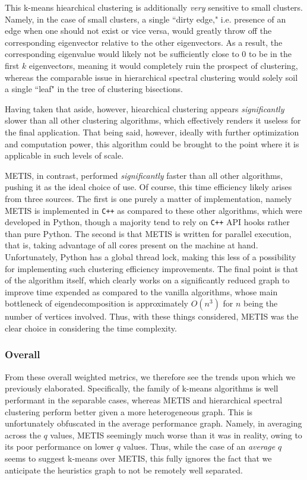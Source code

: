 \documentclass{article}
\begin{document}
This k-means hiearchical clustering is additionally \textit{very} sensitive to small clusters. Namely, in the case of small clusters, a single ``dirty edge," i.e. presence of an edge when one should not exist or vice versa, would greatly throw off the corresponding eigenvector relative to the other eigenvectors. As a result, the corresponding eigenvalue would likely not be sufficiently close to 0 to be in the first $k$ eigenvectors, meaning it would completely ruin the prospect of clustering, whereas the comparable issue in hierarchical spectral clustering would solely soil a single ``leaf" in the tree of clustering bisections.

Having taken that aside, however, hiearchical clustering appears \textit{significantly} slower than all other clustering algorithms, which effectively renders it useless for the final application. That being said, however, ideally with further optimization and computation power, this algorithm could be brought to the point where it is applicable in such levels of scale. 

METIS, in contrast, performed \textit{significantly} faster than all other algorithms, pushing it as the ideal choice of use. Of course, this time efficiency likely arises from three sources. The first is one purely a matter of implementation, namely METIS is implemented in \texttt{C++} as compared to these other algorithms, which were developed in Python, though a majority tend to rely on \texttt{C++} API hooks rather than pure Python. The second is that METIS is written for parallel execution, that is, taking advantage of all cores present on the machine at hand. Unfortunately, Python has a global thread lock, making this less of a possibility for implementing such clustering efficiency improvements. The final point is that of the algorithm itself, which clearly works on a significantly reduced graph to improve time expended as compared to the vanilla algorithms, whose main bottleneck of eigendecomposition is approximately $O(n^3)$ for $n$ being the number of vertices involved. Thus, with these things considered, METIS was the clear choice in considering the time complexity.

\subsubsection{Overall}
From these overall weighted metrics, we therefore see the trends upon which we previously elaborated. Specifically, the family of k-means algorithms is well performant in the separable cases, whereas METIS and hierarchical spectral clustering perform better given a more heterogeneous graph. This is unfortunately obfuscated in the average performance graph. Namely, in averaging across the $q$ values, METIS seemingly much worse than it was in reality, owing to its poor performance on lower $q$ values. Thus, while the case of an \textit{average} $q$ seems to suggest k-means over METIS, this fully ignores the fact that we anticipate the heuristics graph to not be remotely well separated.
\end{document}

